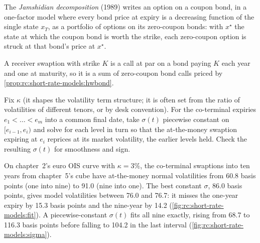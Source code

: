 \begin{definition}\label{def:rc:short-rate-models:jamshidian}
The \emph{Jamshidian decomposition} (1989)
writes an option on a coupon bond, in a one-factor model where every bond price
at expiry is a decreasing function of the single state $x_T$, as a portfolio of
options on its zero-coupon bonds: with $x^\star$ the state at which the coupon
bond is worth the strike, each zero-coupon option is struck at that bond's
price at $x^\star$.
\end{definition}

A receiver swaption with strike $K$ is a call at par on a bond paying $K$ each
year and one at maturity, so it is a sum of zero-coupon bond calls priced by
\cref{prop:rc:short-rate-models:hwbond}.

\label{lst:rc:short-rate-models:jamshidian}

\begin{method}\label{met:rc:short-rate-models:coterminal}
Fix $\kappa$ (it shapes the volatility term structure; it is often set from
the ratio of volatilities of different tenors, or by desk convention). For the
co-terminal expiries $e_1<\dots<e_m$ into a common final date, take
$\sigma(t)$ piecewise constant on $[e_{i-1},e_i)$ and solve for each level in turn
so that the at-the-money swaption expiring at $e_i$ reprices at its market
volatility, the earlier levels held. Check the resulting $\sigma(t)$ for
smoothness and sign.
\end{method}

\begin{example}\label{ex:rc:short-rate-models:fit}
On chapter~2's euro OIS curve with $\kappa=3\%$, the co-terminal swaptions into
ten years from chapter~5's cube have at-the-money normal volatilities from
60.8 basis points (one into nine) to 91.0 (nine into one). The best constant
$\sigma$, 86.0 basis points, gives model volatilities between 76.0 and 76.7: it
misses the one-year expiry by 15.3 basis points and the nine-year by 14.2
(\cref{fig:rc:short-rate-models:fit}). A piecewise-constant $\sigma(t)$ fits all
nine exactly, rising from 68.7 to 116.3 basis points before falling to 104.2 in
the last interval (\cref{fig:rc:short-rate-models:sigma}).
\end{example}

